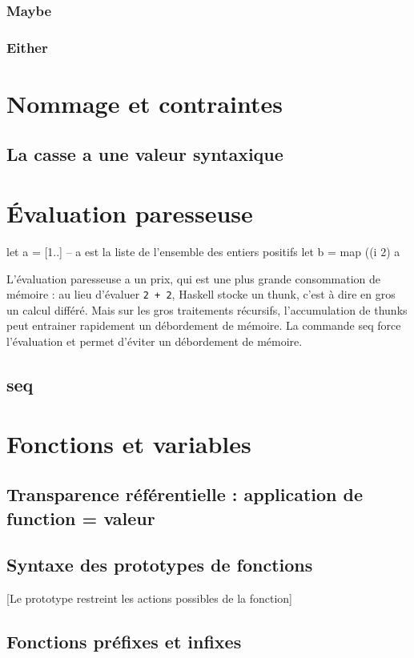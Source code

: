 \documentclass[a5paper,french]{article}
\newcommand{\cmd}[2][]{#2}
\newcommand{\concept}[2][]{#2}
\newcommand\hs[1]{\texttt{#1}}
\begin{document}
\subsubsection   { Maybe}
\subsubsection{ Either}
\section{ Nommage et contraintes}
\subsection{ La casse a une valeur syntaxique}
\section{ Évaluation paresseuse}

\begin{haskellcode}
let a = [1..] -- a est la liste de l'ensemble des entiers positifs
let b = map ((^^) 2) a
\end{haskellcode}

L'évaluation paresseuse a un prix, qui est une plus grande consommation de
mémoire : au lieu d'évaluer \hs{2 + 2}, Haskell stocke un \concept{thunk}, c'est
à dire en gros un calcul différé. Mais sur les gros traitements récursifs,
l'accumulation de \concept[thunk]{thunks} peut entrainer rapidement un
débordement de mémoire. La commande \cmd{seq} force l'évaluation et permet
d'éviter un débordement de mémoire.

\subsection{ seq}
\section{ Fonctions et variables}
\subsection{ Transparence référentielle : application de function = valeur}
\subsection{ Syntaxe des prototypes de fonctions}
        [Le prototype restreint les actions possibles de la fonction]
\subsection{ Fonctions préfixes et infixes}
\end{document}
